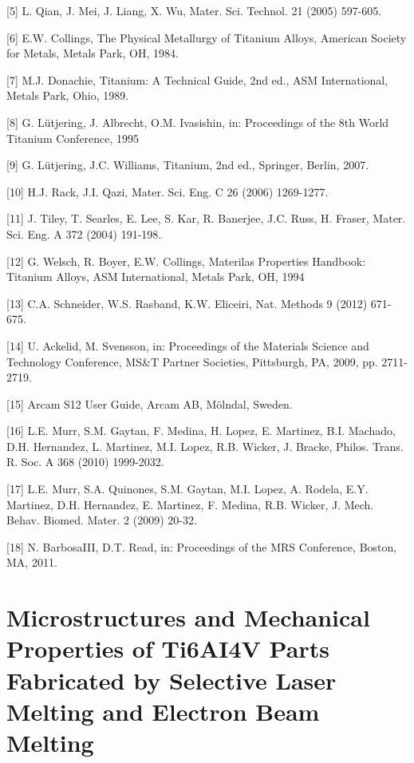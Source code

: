 \documentclass[10pt]{article}
\begin{document}
[5] L. Qian, J. Mei, J. Liang, X. Wu, Mater. Sci. Technol. 21 (2005) 597-605.

[6] E.W. Collings, The Physical Metallurgy of Titanium Alloys, American Society for Metals, Metals Park, OH, 1984.

[7] M.J. Donachie, Titanium: A Technical Guide, 2nd ed., ASM International, Metals Park, Ohio, 1989.

[8] G. Lütjering, J. Albrecht, O.M. Ivasishin, in: Proceedings of the 8th World Titanium Conference, 1995

[9] G. Lütjering, J.C. Williams, Titanium, 2nd ed., Springer, Berlin, 2007.

[10] H.J. Rack, J.I. Qazi, Mater. Sci. Eng. C 26 (2006) 1269-1277.

[11] J. Tiley, T. Searles, E. Lee, S. Kar, R. Banerjee, J.C. Russ, H. Fraser, Mater. Sci. Eng. A 372 (2004) 191-198.

[12] G. Welsch, R. Boyer, E.W. Collings, Materilas Properties Handbook: Titanium Alloys, ASM International, Metals Park, OH, 1994

[13] C.A. Schneider, W.S. Rasband, K.W. Eliceiri, Nat. Methods 9 (2012) 671-675.

[14] U. Ackelid, M. Svensson, in: Proceedings of the Materials Science and Technology Conference, MS\&T Partner Societies, Pittsburgh, PA, 2009, pp. 2711-2719.

[15] Arcam S12 User Guide, Arcam AB, Mölndal, Sweden.

[16] L.E. Murr, S.M. Gaytan, F. Medina, H. Lopez, E. Martinez, B.I. Machado, D.H. Hernandez, L. Martinez, M.I. Lopez, R.B. Wicker, J. Bracke, Philos. Trans. R. Soc. A 368 (2010) 1999-2032.

[17] L.E. Murr, S.A. Quinones, S.M. Gaytan, M.I. Lopez, A. Rodela, E.Y. Martinez, D.H. Hernandez, E. Martinez, F. Medina, R.B. Wicker, J. Mech. Behav. Biomed. Mater. 2 (2009) 20-32.

[18] N. BarbosaIII, D.T. Read, in: Proceedings of the MRS Conference, Boston, MA, 2011.

\section*{Microstructures and Mechanical Properties of Ti6AI4V Parts Fabricated by Selective Laser Melting and Electron Beam Melting }
\end{document}
